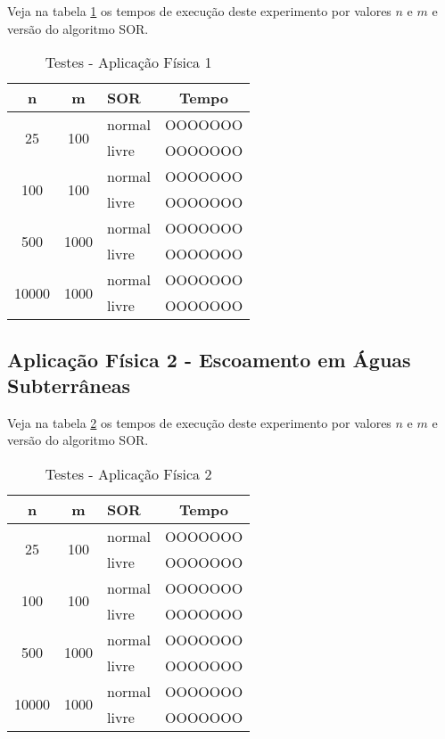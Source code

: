 \documentclass[
	11pt,				%
	oneside,			%
	a4paper,			%
	english,			%
	brazil,				%
	]{article}
\begin{document}
Veja na tabela \ref{tab:taf1} os tempos de execução deste experimento
por valores $n$ e $m$ e versão do algoritmo SOR.

\begin{table}[ht]
\centering
\begin{tabular}{|c|c|l|c|}
\hline 
\textbf{n} & \textbf{m} & \textbf{SOR} & \textbf{Tempo} \\
\hline
\multirow{2}{*}{25}    & \multirow{2}{*}{100}  & normal & OOOOOOO \\
                       &                       & livre  & OOOOOOO \\
\hline
\multirow{2}{*}{100}   & \multirow{2}{*}{100}  & normal & OOOOOOO \\
                       &                       & livre  & OOOOOOO \\
\hline
\multirow{2}{*}{500}   & \multirow{2}{*}{1000} & normal & OOOOOOO \\
                       &                       & livre  & OOOOOOO \\
\hline
\multirow{2}{*}{10000} & \multirow{2}{*}{1000} & normal & OOOOOOO \\
                       &                       & livre  & OOOOOOO \\
\hline
\end{tabular}
\caption{Testes - Aplicação Física 1}
\label{tab:taf1}
\end{table}

\subsection{Aplicação Física 2 - Escoamento em Águas Subterrâneas}
\lipsum[9]

Veja na tabela \ref{tab:taf2} os tempos de execução deste experimento
por valores $n$ e $m$ e versão do algoritmo SOR.

\begin{table}[ht]
\centering
\begin{tabular}{|c|c|l|c|}
\hline 
\textbf{n} & \textbf{m} & \textbf{SOR} & \textbf{Tempo} \\
\hline
\multirow{2}{*}{25}    & \multirow{2}{*}{100}  & normal & OOOOOOO \\
                       &                       & livre  & OOOOOOO \\
\hline
\multirow{2}{*}{100}   & \multirow{2}{*}{100}  & normal & OOOOOOO \\
                       &                       & livre  & OOOOOOO \\
\hline
\multirow{2}{*}{500}   & \multirow{2}{*}{1000} & normal & OOOOOOO \\
                       &                       & livre  & OOOOOOO \\
\hline
\multirow{2}{*}{10000} & \multirow{2}{*}{1000} & normal & OOOOOOO \\
                       &                       & livre  & OOOOOOO \\
\hline
\end{tabular}
\caption{Testes - Aplicação Física 2}
\label{tab:taf2}
\end{table}
\end{document}
